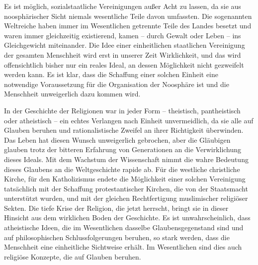 \documentclass[11pt,a4paper]{book}
\begin{document}
Es ist möglich, sozialstaatliche Vereinigungen außer Acht zu lassen, da sie aus noosphärischer Sicht niemals wesentliche Teile davon umfassten. Die sogenannten Weltreiche haben immer im Wesentlichen getrennte Teile des Landes besetzt und waren immer gleichzeitig existierend, kamen -- durch Gewalt oder Leben -- ins Gleichgewicht miteinander. Die Idee einer einheitlichen staatlichen Vereinigung der gesamten Menschheit wird erst in unserer Zeit Wirklichkeit, und das wird offensichtlich bisher nur ein reales Ideal, an dessen Möglichkeit nicht gezweifelt werden kann. Es ist klar, dass die Schaffung einer solchen Einheit eine notwendige Voraussetzung für die Organisation der Noosphäre ist und die Menschheit unweigerlich dazu kommen wird.



In der Geschichte der Religionen war in jeder Form -- theistisch, pantheistisch oder atheistisch -- ein echtes Verlangen nach Einheit unvermeidlich, da sie alle auf Glauben beruhen und rationalistische Zweifel an ihrer Richtigkeit überwinden. Das Leben hat diesen Wunsch unweigerlich gebrochen, aber die Gläubigen glauben trotz der bitteren Erfahrung von Generationen an die Verwirklichung dieses Ideals. Mit dem Wachstum der Wissenschaft nimmt die wahre Bedeutung dieses Glaubens an die Weltgeschichte rapide ab. Für die westliche christliche Kirche, für den Katholizismus endete die Möglichkeit einer solchen Vereinigung tatsächlich mit der Schaffung protestantischer Kirchen, die von der Staatsmacht unterstützt wurden, und mit der gleichen Rechtfertigung muslimischer religiöser Sekten. Die tiefe Krise der Religion, die jetzt herrscht, bringt sie in dieser Hinsicht aus dem wirklichen Boden der Geschichte. Es ist unwahrscheinlich, dass atheistische Ideen, die im Wesentlichen dasselbe Glaubensgegenstand sind und auf philosophischen Schlussfolgerungen beruhen, so stark werden, dass die Menschheit eine einheitliche Sichtweise erhält. Im Wesentlichen sind dies auch religiöse Konzepte, die auf Glauben beruhen.
\end{document}
